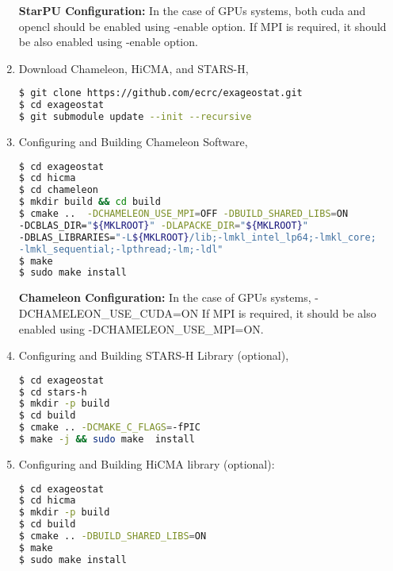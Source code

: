 \documentclass[
10pt, %
a4paper, %
oneside, %
headinclude,footinclude, %
BCOR5mm, %
]{scrartcl}
\begin{document}
\begin{enumerate}
\begin{shaded}
{\textbf {StarPU Configuration:}} In the case of GPUs systems, both cuda and opencl should be enabled using -enable option.
If MPI is required, it should be also enabled using -enable option.
\end{shaded}


\item
\noindent Download Chameleon, HiCMA, and STARS-H,
\begin{lstlisting}[language=bash]
$ git clone https://github.com/ecrc/exageostat.git
$ cd exageostat
$ git submodule update --init --recursive
\end{lstlisting}

\item
\noindent Configuring and Building Chameleon Software,
\begin{lstlisting}[language=bash]
$ cd exageostat
$ cd hicma
$ cd chameleon
$ mkdir build && cd build
$ cmake ..  -DCHAMELEON_USE_MPI=OFF -DBUILD_SHARED_LIBS=ON 
-DCBLAS_DIR="${MKLROOT}" -DLAPACKE_DIR="${MKLROOT}"
-DBLAS_LIBRARIES="-L${MKLROOT}/lib;-lmkl_intel_lp64;-lmkl_core; 
-lmkl_sequential;-lpthread;-lm;-ldl"
$ make 
$ sudo make install
\end{lstlisting}

\begin{shaded}
{\textbf {Chameleon Configuration:}} In the case of GPUs systems,  -DCHAMELEON\_USE\_CUDA=ON
If MPI is required, it should be also enabled using -DCHAMELEON\_USE\_MPI=ON.
\end{shaded}

\item
\noindent Configuring and Building STARS-H Library (optional),
\begin{lstlisting}[language=bash]
$ cd exageostat
$ cd stars-h
$ mkdir -p build
$ cd build
$ cmake .. -DCMAKE_C_FLAGS=-fPIC 
$ make -j && sudo make  install
\end{lstlisting}



\item
\noindent Configuring and Building HiCMA library (optional):
\begin{lstlisting}[language=bash]
$ cd exageostat
$ cd hicma
$ mkdir -p build
$ cd build
$ cmake .. -DBUILD_SHARED_LIBS=ON
$ make 
$ sudo make install
\end{lstlisting}
\end{enumerate}
\end{document}
